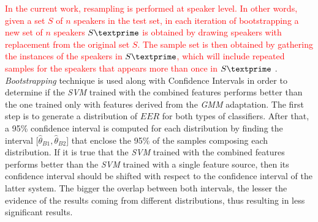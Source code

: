 \textcolor{red}{
  In the current work, resampling is performed at speaker level.
  In other words, given a set $S$ of $n$ speakers in the
  test set, in each iteration of bootstrapping
  a new set of $n$ speakers $S\textprime$ is obtained by drawing speakers with replacement from the
  original set $S$. The sample set is then obtained by gathering the instances of the speakers
  in $S\textprime$, which will include repeated samples for the speakers that appears more than once
  in $S\textprime$
}. \textit{Bootstrapping} technique is used along with Confidence
Intervals in order to determine if the \textit{SVM} trained with the combined features
performs better than the one trained only with features derived from the \textit{GMM} adaptation.
The first step is to generate a distribution of $EER$ for both types of classifiers.
After that,
a 95\% confidence interval is computed for each distribution by finding the interval
[$\hat{\theta}_{B1}, \hat{\theta}_{B2}$] that enclose the 95\% of the samples
composing each distribution.
If it is true that the \textit{SVM} trained with
the combined features performs better than the
\textit{SVM} trained with a single feature source, then its confidence
interval should be shifted with respect to the confidence interval
of the latter system.
The bigger the overlap between both intervals, the
lesser the evidence of the results coming from different distributions, thus
resulting in less significant results.
